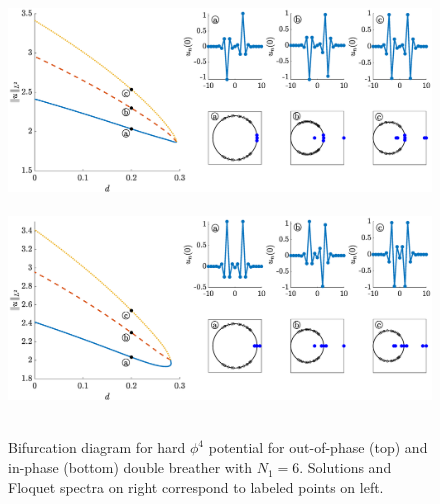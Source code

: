\documentclass[12pt,reqno]{amsart}
\theoremstyle{definition}
\begin{document}
\begin{figure}
	\hbox{
	\hspace{-2cm}
	\includegraphics[width=20cm]{bifdiagphi4oppositeN6.eps}
	}
	\hbox{
	\hspace{-2cm}
	\includegraphics[width=20cm]{bifdiagphi4inphaseN6.eps}
	}
	\caption{Bifurcation diagram for hard $\phi^4$ potential for out-of-phase (top) and in-phase (bottom) double breather with $N_1 = 6$. Solutions and Floquet spectra on right correspond to labeled points on left.}
	\label{fig:bifdiagphi4}
\end{figure}
\end{document}
